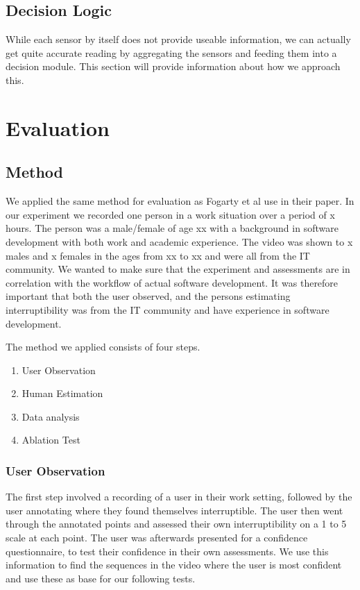 \documentclass{sigchi}
\begin{document}
\subsection{Decision Logic}
While each sensor by itself does not provide useable information, we can actually get quite accurate reading by aggregating the sensors and feeding them into a decision module.
This section will provide information about how we approach this.


\section{Evaluation}

\subsection{Method}
We applied the same method for evaluation as Fogarty et al \cite{fogarty2005predicting} use in their paper.
In our experiment we recorded one person in a work situation over a period of x hours.
The person was a male/female of age xx with a background in software development with both work and academic experience.
The video was shown to x males and x females in the ages from xx to xx and were all from the IT community.
We wanted to make sure that the experiment and assessments are in correlation with the workflow of actual software development.
It was therefore important that both the user observed, and the persons estimating interruptibility was from the IT community and have experience in software development.

The method we applied consists of four steps.

\begin{enumerate}
  \item User Observation
  \item Human Estimation
  \item Data analysis
  \item Ablation Test
\end{enumerate}

\subsubsection{User Observation}
The first step involved a recording of a user in their work setting, followed by the user annotating where they found themselves interruptible.
The user then went through the annotated points and assessed their own interruptibility on a 1 to 5 scale at each point.
The user was afterwards presented for a confidence questionnaire, to test their confidence in their own assessments.
We use this information to find the sequences in the video where the user is most confident and use these as base for our following tests.
\end{document}
